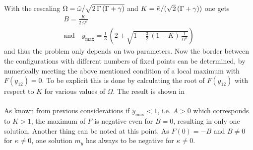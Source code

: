 With the rescaling $\Omega=\tilde{\omega}/\sqrt{2\,\Gamma\,(\Gamma+\gamma)}$ and $K=\tilde{\kappa}/(\sqrt{2}\,(\Gamma+\gamma))$ one gets
\begin{gather*}
    B=\frac{K}{2\,\Omega^2}\\\text{and}\quad
    y_\text{max}=\frac{1}{3}\,\left( 2+ \sqrt{1-\frac{3}{2}\,(1-K)\,\frac{1}{\Omega^2}}  \right)
\end{gather*}
and thus the problem only depends on two parameters. Now the border between the configurations with different numbers of fixed points can be determined, by numerically meeting the above mentioned condition of a local maximum with $F(y_{12})=0$. To be explicit this is done by calculating the root of $F(y_{12})$ with respect to $K$ for various values of $\Omega$. The result is shown in \\\\As known from previous considerations if $y_\text{max}<1$, i.e. $A>0$ which corresponds to $K>1$, the maximum of $F$ is negative even for $B=0$, resulting in only one solution. Another thing can be noted at this point. As $F(0)=-B$ and $B\neq0$ for $\kappa\neq0$, one solution $m_y$ has always to be negative for $\kappa\neq0$.\\\\

